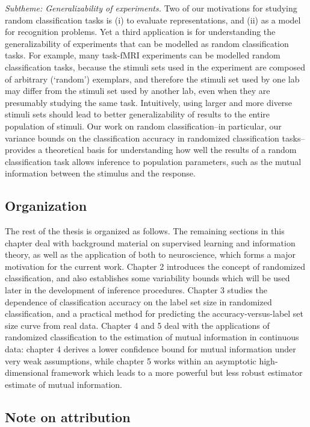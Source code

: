 \emph{Subtheme: Generalizability of experiments.} Two of our
motivations for studying random classification tasks is (i) to
evaluate representations, and (ii) as a model for recognition
problems.  Yet a third application is for understanding the
generalizability of experiments that can be modelled as random
classification tasks.  For example, many task-fMRI experiments can be
modelled random classification tasks, because the stimuli sets used in
the experiment are composed of arbitrary (`random') exemplars, and
therefore the stimuli set used by one lab may differ from the stimuli
set used by another lab, even when they are presumably studying the
same task.  Intuitively, using larger and more diverse stimuli sets
should lead to better generalizability of results to the entire
population of stimuli.  Our work on random classification--in
particular, our variance bounds on the classification accuracy in
randomized classification tasks--provides a theoretical basis for
understanding how well the results of a random classification task
allows inference to population parameters, such as the mutual
information between the stimulus and the response.

\subsection{Organization}

The rest of the thesis is organized as follows.  The remaining
sections in this chapter deal with background material on supervised
learning and information theory, as well as the application of both to
neuroscience, which forms a major motivation for the current work.
Chapter 2 introduces the concept of randomized classification, and
also establishes some variability bounds which will be used later in
the development of inference procedures.  Chapter 3 studies the
dependence of classification accuracy on the label set size in
randomized classification, and a practical method for predicting the
accuracy-versus-label set size curve from real data.  Chapter 4 and 5
deal with the applications of randomized classification to the
estimation of mutual information in continuous data: chapter 4 derives
a lower confidence bound for mutual information under very weak
assumptions, while chapter 5 works within an asymptotic
high-dimensional framework which leads to a more powerful but less
robust estimator estimate of mutual information.


\subsection{Note on attribution}


